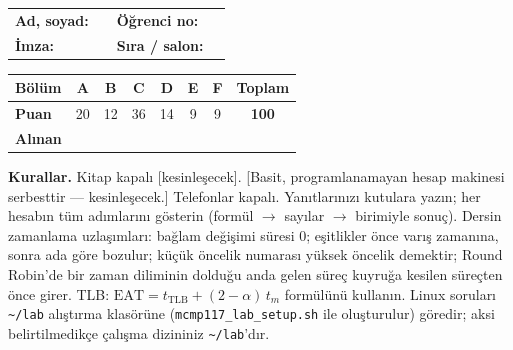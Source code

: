 \documentclass[11pt,a4paper]{article}
\begin{document}
\begin{center}
\renewcommand{\arraystretch}{1.6}
\begin{tabularx}{\linewidth}{@{}lX lX@{}}
\textbf{Ad, soyad:} & \hrulefill & \textbf{Öğrenci no:} & \hrulefill \\
\textbf{İmza:} & \hrulefill & \textbf{Sıra / salon:} & \hrulefill \\
\end{tabularx}

\vspace{0.4em}
\renewcommand{\arraystretch}{1.35}
\begin{tabular}{|l|c|c|c|c|c|c|c|}
\hline
\textbf{Bölüm} & A & B & C & D & E & F & \textbf{Toplam} \\ \hline
\textbf{Puan} & 20 & 12 & 36 & 14 & 9 & 9 & \textbf{100} \\ \hline
\textbf{Alınan} & & & & & & & \\[0.4em] \hline
\end{tabular}
\end{center}

\textbf{Kurallar.} Kitap kapalı [kesinleşecek]. [Basit, programlanamayan hesap makinesi serbesttir --- kesinleşecek.] Telefonlar kapalı. Yanıtlarınızı kutulara yazın; her hesabın tüm adımlarını gösterin (formül $\to$ sayılar $\to$ birimiyle sonuç). Dersin zamanlama uzlaşımları: bağlam değişimi süresi $0$; eşitlikler önce varış zamanına, sonra ada göre bozulur; küçük öncelik numarası yüksek öncelik demektir; Round Robin'de bir zaman diliminin dolduğu anda gelen süreç kuyruğa kesilen süreçten önce girer. TLB: $\text{EAT} = t_{\text{TLB}} + (2-\alpha)\,t_m$ formülünü kullanın. Linux soruları \texttt{\textasciitilde/lab} alıştırma klasörüne (\texttt{mcmp117\_lab\_setup.sh} ile oluşturulur) göredir; aksi belirtilmedikçe çalışma dizininiz \texttt{\textasciitilde/lab}'dır.

\end{document}
